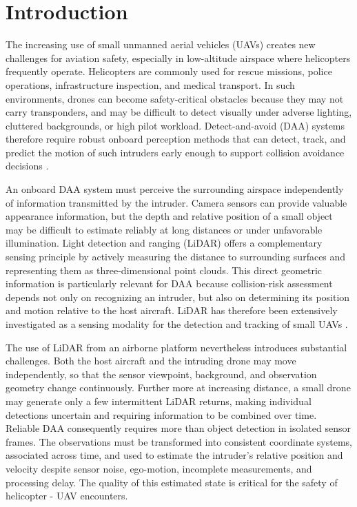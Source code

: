 \chapter{Introduction}

The increasing use of small unmanned aerial vehicles (UAVs) creates new challenges for aviation safety, especially in low-altitude airspace where helicopters frequently operate. Helicopters are commonly used for rescue missions, police operations, infrastructure inspection, and medical transport. In such environments, drones can become safety-critical obstacles because they may not carry transponders, and may be difficult to detect visually under adverse lighting, cluttered backgrounds, or high pilot workload. Detect-and-avoid (DAA) systems therefore require robust onboard perception methods that can detect, track, and predict the motion of such intruders early enough to support collision avoidance decisions \cite{fasano2016senseAvoid,skowron2019senseAvoidSmallUAS,riedel2025daaStandards}.

An onboard DAA system must perceive the surrounding airspace independently of information transmitted by the intruder. Camera sensors can provide valuable appearance information, but the depth and relative position of a small object may be difficult to estimate reliably at long distances or under unfavorable illumination. Light detection and ranging (LiDAR) offers a complementary sensing principle by actively measuring the distance to surrounding surfaces and representing them as three-dimensional point clouds. This direct geometric information is particularly relevant for DAA because collision-risk assessment depends not only on recognizing an intruder, but also on determining its position and motion relative to the host aircraft. LiDAR has therefore been extensively investigated as a sensing modality for the detection and tracking of small UAVs \cite{hammer2018potentialLidarUAV,hammer2018lidarSmallUAVs,dogru2022sparseLidarDrone}.

The use of LiDAR from an airborne platform nevertheless introduces substantial challenges. Both the host aircraft and the intruding drone may move independently, so that the sensor viewpoint, background, and observation geometry change continuously. Further more at increasing distance, a small drone may generate only a few intermittent LiDAR returns, making individual detections uncertain and requiring information to be combined over time. Reliable DAA consequently requires more than object detection in isolated sensor frames. The observations must be transformed into consistent coordinate systems, associated across time, and used to estimate the intruder's relative position and velocity despite sensor noise, ego-motion, incomplete measurements, and processing delay. The quality of this estimated state is critical for the safety of helicopter - UAV encounters.

